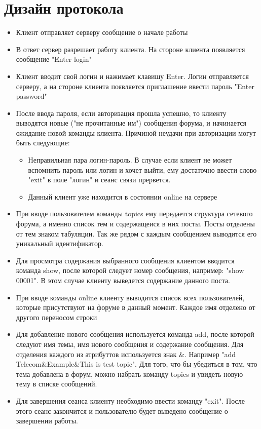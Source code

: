 \documentclass[10pt,a4paper]{report}
\begin{document}
\section{Дизайн протокола}
\begin{itemize}
\item Клиент отправляет серверу сообщение о начале работы 
\item В ответ сервер разрешает работу клиента. На стороне клиента появляется сообщение "Enter login"
\item Клиент вводит свой логин и нажимает клавишу Enter. Логин отправляется серверу, а на стороне клиента появляется приглашение ввести пароль "Enter password"
\item После ввода пароля, если авторизация прошла успешно, то клиенту выводятся новые ("не прочитанные им") сообщения форума, и начинается ожидание новой команды клиента. Причиной неудачи при авторизации могут быть следующие:
\begin{itemize}
\item Неправильная пара логин-пароль. В случае если клиент не может вспомнить пароль или логин и хочет выйти, ему достаточно ввести слово "exit" в поле "логин" и сеанс связи прервется.
\item Данный клиент уже находится в состоянии online на сервере
\end{itemize}
\item При вводе пользователем команды topics ему передается структура сетевого форума, а именно список тем и содержащеися в них посты. Посты отделены от тем знаком табуляции. Так же рядом с каждым сообщением выводится его уникальный идентификатор.
\item Для просмотра содержания выбранного сообщения клиентом вводится команда show, после которой следует номер сообщения, например: "show 00001". В этом случае клиенту выведется содержание данного поста.
\item При вводе команды online клиенту выводится список всех пользователей, которые присутствуют на форуме в данный момент. Каждое имя отделено от другого переносом строки
\item Для добавление нового сообщения используется команда add, после которой следуют имя темы, имя нового сообщения и содержание сообщения. Для отделения каждого из атрибуттов используется знак \&. Например "add Telecom\&Example\&This is test topic". Для того, что бы убедиться в том, что тема добавлена в форум, можно набрать команду topics и увидеть новую тему в списке сообщений.
\item Для завершения сеанса клиенту необходимо ввести команду "exit". После этого сеанс закончится и пользователю будет выведено сообщение о завершении работы.
\end{itemize}
\end{document}

